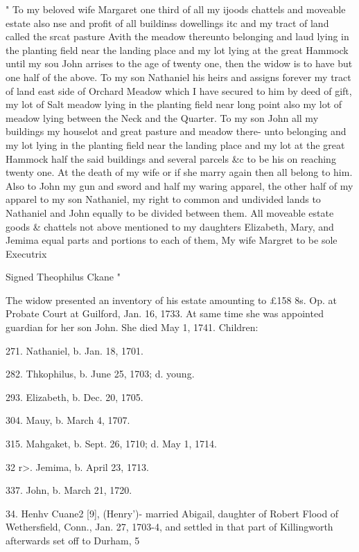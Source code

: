 \documentclass{book}
\begin{document}
" To my beloved wife Margaret one third of all my ijoods chattels and 
moveable estate also nse and profit of all buildinss dowellings itc and 
my tract of land called the srcat pasture Avith the meadow thereunto 
belonging and laud lying in the planting field near the landing place and 
my lot lying at the great Hammock until my sou John arrises to the age 
of twenty one, then the widow is to have but one half of the above. 
To my son Nathaniel his heirs and assigns forever my tract of land east 
side of Orchard Meadow which I have secured to him by deed of gift, 
my lot of Salt meadow lying in the planting field near long point also my 
lot of meadow lying between the Neck and the Quarter. To my son 
John all my buildings my houselot and great pasture and meadow there- 
unto belonging and my lot lying in the planting field near the landing 
place and my lot at the great Hammock half the said buildings and 
several parcels \&c to be his on reaching twenty one. At the death of my 
wife or if she marry again then all belong to him. Also to John my gun 
and sword and half my waring apparel, the other half of my apparel to 
my son Nathaniel, my right to common and undivided lands to Nathaniel 
and John equally to be divided between them. All moveable estate 
goods \& chattels not above mentioned to my daughters Elizabeth, Mary, 
and Jemima equal parts and portions to each of them, 
My wife Margret to be sole Executrix 

Signed Theophilus Ckane " 

The widow presented an inventory of his estate amounting to 
£158 8s. Op. at Probate Court at Guilford, Jan. 16, 1733. 
At same time she was appointed guardian for her son John. She 
died May 1, 1741. Children: 

271. Nathaniel, b. Jan. 18, 1701. 

282. Thkophilus, b. June 25, 1703; d. young. 

293. Elizabeth, b. Dec. 20, 1705. 

304. Mauy, b. March 4, 1707. 

315. Mahgaket, b. Sept. 26, 1710; d. May 1, 1714. 

32 r>. Jemima, b. April 23, 1713. 

337. John, b. March 21, 1720. 

34. Henhv Cuane2 [9], (Henry')- married Abigail, daughter 
of Robert Flood of Wethersfield, Conn., Jan. 27, 1703-4, and 
settled in that part of Killingworth afterwards set off to Durham, 
5 
\end{document}
